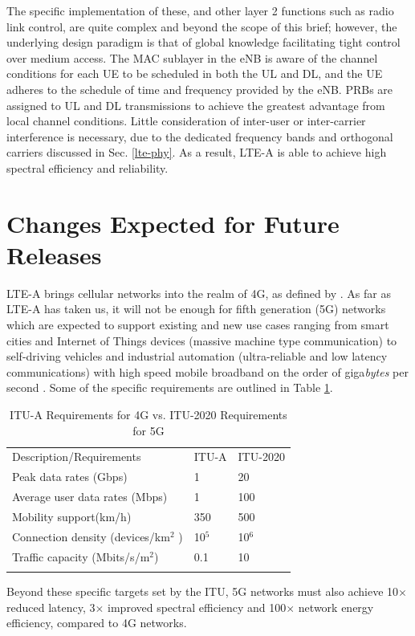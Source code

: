 The specific implementation of these, and other layer 2 functions such as radio link control, are quite complex and beyond the scope of this brief; however, the underlying design paradigm is that of global knowledge facilitating tight control over medium access. The MAC sublayer in the eNB is aware of the channel conditions for each UE to be scheduled in both the UL and DL, and the UE adheres to the schedule of time and frequency provided by the eNB.  PRBs are assigned to UL and DL transmissions to achieve the greatest advantage from local channel conditions. Little consideration of inter-user or inter-carrier interference is necessary, due to the dedicated frequency bands and orthogonal carriers discussed in Sec. \ref{lte-phy}.  As a result, \mbox{LTE-A} is able to achieve high spectral efficiency and reliability.


\section {Changes Expected for Future Releases}
\label{fut-chnge}
\mbox{LTE-A} brings cellular networks into the realm of 4G, as defined by \cite{itu-advanced}.  As far as \mbox{LTE-A} has taken us, it will not be enough for fifth generation (5G) networks which are expected to support existing and new use cases ranging from smart cities and Internet of Things devices (massive machine type communication) to self-driving vehicles and industrial automation (ultra-reliable and low latency communications) with  high speed mobile broadband on the order of giga\emph{bytes} per second \cite{itu-2020}.  Some of the specific requirements are outlined in Table \ref{5g-table}.
\begin{table}
	\caption{ITU-A Requirements for 4G vs. ITU-2020 Requirements for 5G  \cite{itu-2020}}
	\label{5g-table}      
	\begin{tabular}{p{}p{}p{}}
		\hline\noalign{\smallskip}
		Description/Requirements & ITU-A & ITU-2020  \\
		\noalign{\smallskip}\svhline\noalign{\smallskip}
		Peak data rates (Gbps) & 1  & 20\\
		Average user data rates (Mbps) & 1  & 100  \\				
		Mobility support(km/h) & 350  & 500 \\
		Connection density (devices/km$^2$ )& 10$^5$ & 10$^6$ \\
		Traffic capacity (Mbits/s/m$^2$) & 0.1 & 10 \\
		\noalign{\smallskip}\hline\noalign{\smallskip}
	\end{tabular}
		
\end{table}
Beyond these specific targets set by the ITU, 5G networks must also achieve 10$\times$ reduced latency, 3$\times$ improved spectral efficiency and  100$\times$ network energy efficiency, compared to 4G networks. 

